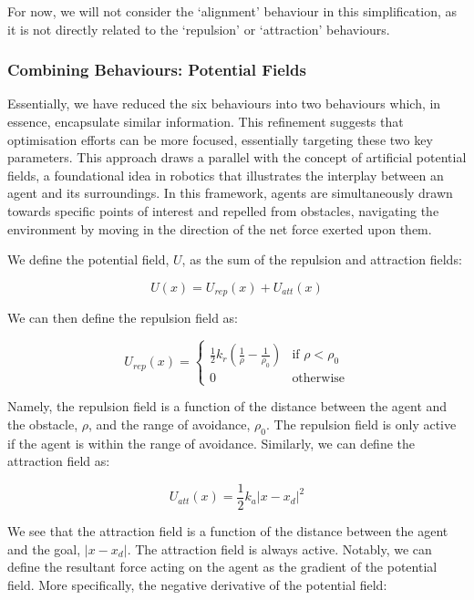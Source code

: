 \documentclass[12pt]{article}
\begin{document}
For now, we will not consider the `alignment' behaviour in this simplification, as it is not directly related to the `repulsion' or `attraction' behaviours.

\subsubsection{Combining Behaviours: Potential Fields}
Essentially, we have reduced the six behaviours into two behaviours which, in essence, encapsulate similar information. This refinement suggests that optimisation efforts can be more focused, essentially targeting these two key parameters. This approach draws a parallel with the concept of artificial potential fields, a foundational idea in robotics that illustrates the interplay between an agent and its surroundings. In this framework, agents are simultaneously drawn towards specific points of interest and repelled from obstacles, navigating the environment by moving in the direction of the net force exerted upon them.

We define the potential field, $U$, as the sum of the repulsion and attraction fields:

\begin{equation}
    U(x) = U_{rep}(x) + U_{att}(x)
\end{equation}

We can then define the repulsion field as:

\begin{equation}
    U_{rep}(x) = 
    \begin{cases}
        \frac{1}{2}k_r(\frac{1}{\rho}-\frac{1}{\rho_0}) & \text{if } \rho < \rho_0 \\
        0 & \text{otherwise}
    \end{cases}
\end{equation}

Namely, the repulsion field is a function of the distance between the agent and the obstacle, $\rho$, and the range of avoidance, $\rho_0$. The repulsion field is only active if the agent is within the range of avoidance. Similarly, we can define the attraction field as:

\begin{equation}
    U_{att}(x) = \frac{1}{2}k_a|x-x_d|^2
\end{equation}

We see that the attraction field is a function of the distance between the agent and the goal, $|x-x_d|$. The attraction field is always active. Notably, we can define the resultant force acting on the agent as the gradient of the potential field. More specifically, the negative derivative of the potential field:
\end{document}
